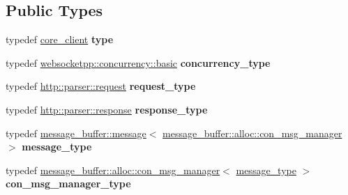 \subsection*{Public Types}
\begin{DoxyCompactItemize}
\item 
\mbox{\label{structwebsocketpp_1_1config_1_1core__client_a0d7afa0193a253a7afa8b8f3cc914019}} 
typedef \mbox{\hyperlink{structwebsocketpp_1_1config_1_1core__client}{core\+\_\+client}} {\bfseries type}
\item 
\mbox{\label{structwebsocketpp_1_1config_1_1core__client_a4efeeb870e648c7405daab92d10fa5d6}} 
typedef \mbox{\hyperlink{classwebsocketpp_1_1concurrency_1_1basic}{websocketpp\+::concurrency\+::basic}} {\bfseries concurrency\+\_\+type}
\item 
\mbox{\label{structwebsocketpp_1_1config_1_1core__client_a1fd74b16e3add246b1c356f6f14f206b}} 
typedef \mbox{\hyperlink{classwebsocketpp_1_1http_1_1parser_1_1request}{http\+::parser\+::request}} {\bfseries request\+\_\+type}
\item 
\mbox{\label{structwebsocketpp_1_1config_1_1core__client_a5d8d6a90c7f36442a61a615da2ac8dcc}} 
typedef \mbox{\hyperlink{classwebsocketpp_1_1http_1_1parser_1_1response}{http\+::parser\+::response}} {\bfseries response\+\_\+type}
\item 
\mbox{\label{structwebsocketpp_1_1config_1_1core__client_ae370adc4110d5d6c709167462467b11c}} 
typedef \mbox{\hyperlink{classwebsocketpp_1_1message__buffer_1_1message}{message\+\_\+buffer\+::message}}$<$ \mbox{\hyperlink{classwebsocketpp_1_1message__buffer_1_1alloc_1_1con__msg__manager}{message\+\_\+buffer\+::alloc\+::con\+\_\+msg\+\_\+manager}} $>$ {\bfseries message\+\_\+type}
\item 
\mbox{\label{structwebsocketpp_1_1config_1_1core__client_ae5d0b586e86a2520bdefe60d61849d37}} 
typedef \mbox{\hyperlink{classwebsocketpp_1_1message__buffer_1_1alloc_1_1con__msg__manager}{message\+\_\+buffer\+::alloc\+::con\+\_\+msg\+\_\+manager}}$<$ \mbox{\hyperlink{classwebsocketpp_1_1message__buffer_1_1message}{message\+\_\+type}} $>$ {\bfseries con\+\_\+msg\+\_\+manager\+\_\+type}

\end{DoxyCompactItemize}
